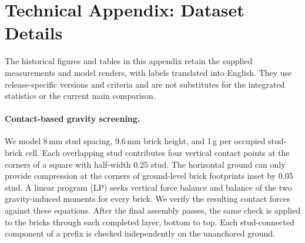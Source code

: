 \documentclass[letterpaper]{article} %
\begin{document}

\FloatBarrier
\appendix
\section{Technical Appendix: Dataset Details}
\label{app:dataset}
The historical figures and tables in this appendix retain the supplied measurements and model renders, with labels translated into English. They use release-specific versions and criteria and are not substitutes for the integrated statistics or the current main comparison.

\paragraph{Contact-based gravity screening.}
We model 8\,mm stud spacing, 9.6\,mm brick height, and 1\,g per occupied stud-brick cell. Each overlapping stud contributes four vertical contact points at the corners of a square with half-width 0.25 stud. The horizontal ground can only provide compression at the corners of ground-level brick footprints inset by 0.05 stud. A linear program (LP) seeks vertical force balance and balance of the two gravity-induced moments for every brick. We verify the resulting contact forces against these equations. After the final assembly passes, the same check is applied to the bricks through each completed layer, bottom to top. Each stud-connected component of a prefix is checked independently on the unanchored ground.
\end{document}
